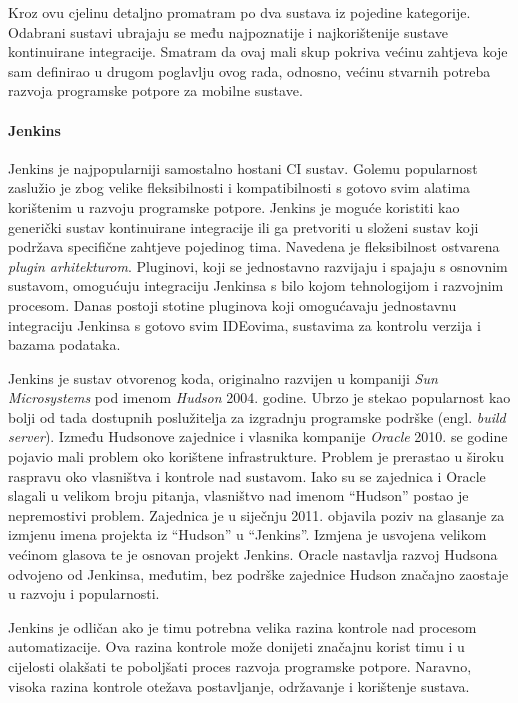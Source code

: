 \documentclass[times, utf8, diplomski, numeric]{fer}
\newcommand{\eng}[1]{(engl. \textit{#1})}
\begin{document}
Kroz ovu cjelinu detaljno promatram po dva sustava iz pojedine kategorije. Odabrani sustavi ubrajaju se među najpoznatije i najkorištenije sustave kontinuirane integracije. Smatram da ovaj mali skup pokriva većinu zahtjeva koje sam definirao u drugom poglavlju ovog rada, odnosno, većinu stvarnih potreba razvoja programske potpore za mobilne sustave.

\paragraph{Jenkins}

Jenkins je najpopularniji samostalno hostani CI sustav. Golemu popularnost zaslužio je zbog velike fleksibilnosti i kompatibilnosti s gotovo svim alatima korištenim u razvoju programske potpore. Jenkins je moguće koristiti kao generički sustav kontinuirane integracije ili ga pretvoriti u složeni sustav koji podržava specifične zahtjeve pojedinog tima. Navedena je fleksibilnost ostvarena \textit{plugin arhitekturom}. Pluginovi, koji se jednostavno razvijaju i spajaju s osnovnim sustavom, omogućuju integraciju Jenkinsa s bilo kojom tehnologijom i razvojnim procesom. Danas postoji stotine pluginova koji omogućavaju jednostavnu integraciju Jenkinsa s gotovo svim IDEovima, sustavima za kontrolu verzija i bazama podataka\citep{wiki:Jenkins}.

Jenkins je sustav otvorenog koda, originalno razvijen u kompaniji \textit{Sun Microsystems} pod imenom \textit{Hudson}\citep{wiki:Hudson} 2004. godine. Ubrzo je stekao popularnost kao bolji od tada dostupnih poslužitelja za izgradnju programske podrške \eng{build server}. Između Hudsonove zajednice i vlasnika kompanije \textit{Oracle} 2010. se godine pojavio mali problem oko korištene infrastrukture. Problem je prerastao u široku raspravu oko vlasništva i kontrole nad sustavom. Iako su se zajednica i Oracle slagali u velikom broju pitanja, vlasništvo nad imenom “Hudson” postao je nepremostivi problem.  Zajednica je u siječnju 2011. objavila poziv na glasanje za izmjenu imena projekta iz “Hudson” u “Jenkins”. Izmjena je usvojena velikom većinom glasova te je osnovan projekt Jenkins. Oracle nastavlja razvoj Hudsona odvojeno od Jenkinsa, međutim, bez podrške zajednice Hudson značajno zaostaje u razvoju i popularnosti.

Jenkins je odličan ako je timu potrebna velika razina kontrole nad procesom automatizacije. Ova razina kontrole može donijeti značajnu korist timu i u cijelosti olakšati te poboljšati proces razvoja programske potpore. Naravno, visoka razina kontrole otežava postavljanje, održavanje i korištenje sustava.
\end{document}
